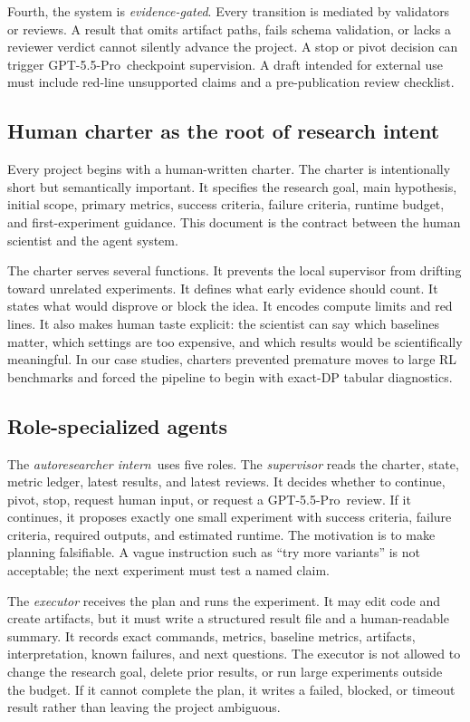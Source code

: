 \documentclass{article}
\newcommand{\intern}{\emph{autoresearcher intern}}
\newcommand{\gptpro}{GPT-5.5-Pro}
\begin{document}
Fourth, the system is \emph{evidence-gated}. Every transition is mediated by validators or reviews. A result that omits artifact paths, fails schema validation, or lacks a reviewer verdict cannot silently advance the project. A stop or pivot decision can trigger \gptpro\ checkpoint supervision. A draft intended for external use must include red-line unsupported claims and a pre-publication review checklist.

\subsection{Human charter as the root of research intent}

Every project begins with a human-written charter. The charter is intentionally short but semantically important. It specifies the research goal, main hypothesis, initial scope, primary metrics, success criteria, failure criteria, runtime budget, and first-experiment guidance. This document is the contract between the human scientist and the agent system.

The charter serves several functions. It prevents the local supervisor from drifting toward unrelated experiments. It defines what early evidence should count. It states what would disprove or block the idea. It encodes compute limits and red lines. It also makes human taste explicit: the scientist can say which baselines matter, which settings are too expensive, and which results would be scientifically meaningful. In our case studies, charters prevented premature moves to large RL benchmarks and forced the pipeline to begin with exact-DP tabular diagnostics.

\subsection{Role-specialized agents}

The \intern\ uses five roles. The \emph{supervisor} reads the charter, state, metric ledger, latest results, and latest reviews. It decides whether to continue, pivot, stop, request human input, or request a \gptpro\ review. If it continues, it proposes exactly one small experiment with success criteria, failure criteria, required outputs, and estimated runtime. The motivation is to make planning falsifiable. A vague instruction such as ``try more variants'' is not acceptable; the next experiment must test a named claim.

The \emph{executor} receives the plan and runs the experiment. It may edit code and create artifacts, but it must write a structured result file and a human-readable summary. It records exact commands, metrics, baseline metrics, artifacts, interpretation, known failures, and next questions. The executor is not allowed to change the research goal, delete prior results, or run large experiments outside the budget. If it cannot complete the plan, it writes a failed, blocked, or timeout result rather than leaving the project ambiguous.
\end{document}
